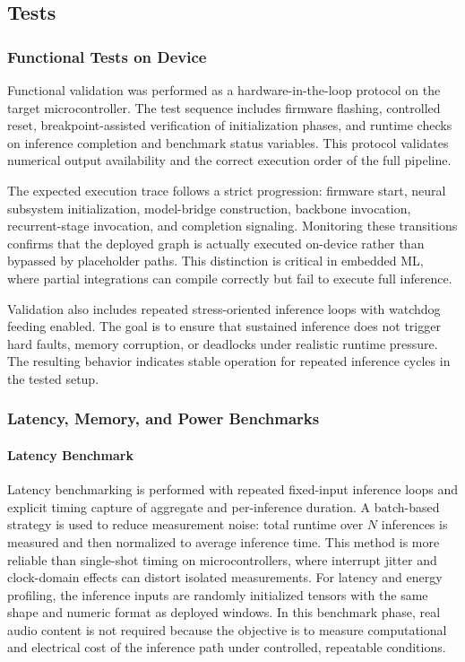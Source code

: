 \documentclass[a4paper,singleside,12pt]{report} %
\begin{document}
\subsection{Tests}
\subsubsection{Functional Tests on Device}
	Functional validation was performed as a hardware-in-the-loop protocol on the target microcontroller. The test sequence includes firmware flashing, controlled reset, breakpoint-assisted verification of initialization phases, and runtime checks on inference completion and benchmark status variables. This protocol validates numerical output availability and the correct execution order of the full pipeline.

	The expected execution trace follows a strict progression: firmware start, neural subsystem initialization, model-bridge construction, backbone invocation, recurrent-stage invocation, and completion signaling. Monitoring these transitions confirms that the deployed graph is actually executed on-device rather than bypassed by placeholder paths. This distinction is critical in embedded ML, where partial integrations can compile correctly but fail to execute full inference.

		\begin{sloppypar}
		Validation also includes repeated stress-oriented inference loops with watchdog feeding enabled. The goal is to ensure that sustained inference does not trigger hard faults, memory corruption, or deadlocks under realistic runtime pressure. The resulting behavior indicates stable operation for repeated inference cycles in the tested setup.
		\end{sloppypar}
\subsubsection{Latency, Memory, and Power Benchmarks}
\label{sec:device_benchmarks}
	\paragraph{Latency Benchmark}
	Latency benchmarking is performed with repeated fixed-input inference loops and explicit timing capture of aggregate and per-inference duration. A batch-based strategy is used to reduce measurement noise: total runtime over \(N\) inferences is measured and then normalized to average inference time. This method is more reliable than single-shot timing on microcontrollers, where interrupt jitter and clock-domain effects can distort isolated measurements.
	For latency and energy profiling, the inference inputs are randomly initialized tensors with the same shape and numeric format as deployed windows. In this benchmark phase, real audio content is not required because the objective is to measure computational and electrical cost of the inference path under controlled, repeatable conditions.
\end{document}

